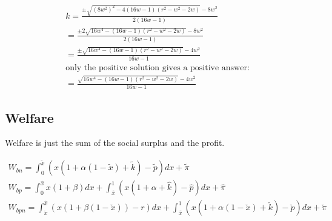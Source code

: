 \documentclass[11pt]{article}
\begin{document}
\begin{align*}
k = \frac{\pm \sqrt{\left(8 w^2\right)^2-4 (16 w-1) \left(r^2-w^2-2 w\right)}-8 w^2}{2(16 w-1)} \\
=\frac{\pm 2 \sqrt{16 w^4- (16 w-1) \left(r^2-w^2-2 w\right)}-8 w^2}{2(16 w-1)} \\
=\frac{\pm \sqrt{16 w^4- (16 w-1) \left(r^2-w^2-2 w\right)}-4 w^2}{16 w-1} \\
\text{only the positive solution gives a positive answer:} \\
= \frac{ \sqrt{16 w^4- (16 w-1) \left(r^2-w^2-2 w\right)}-4 w^2}{16 w-1}
\end{align*}

\subsection{Welfare}

Welfare is just the sum of the social surplus and the profit.

\begin{align*}
W_{bn} = \int^{\tilde{x}}_0 \left(x(1+\alpha(1-\tilde{x})+\tilde{k})-\tilde{p} \right) dx + \tilde{\pi}  \\
W_{bp} = \int^{\hat{x}}_0 x(1+\beta) dx +\int^{1}_{\hat{x}} \left(x(1+\alpha+\hat{k}) - \hat{p} \right) dx + \hat{\pi} \\
W_{bpn} =
\int^{\hat{x}}_{\check{x}} \left(x(1+\beta(1-\check{x}))-r \right)dx +\int^{1}_{\hat{x}} \left(x(1+\alpha(1-\check{x})+\check{k}) - \check{p} \right) dx + \check{\pi}
\end{align*}


\newpage


%
\end{document}

